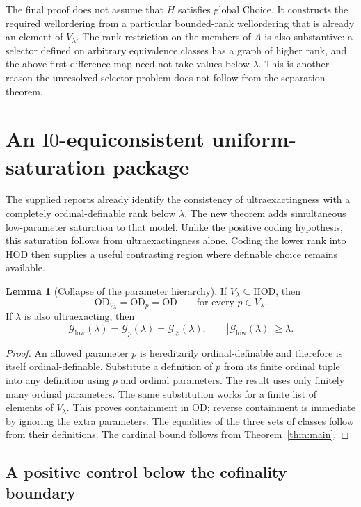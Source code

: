 \documentclass[11pt,letterpaper]{article}
\theoremstyle{definition}
\newtheorem{lemma}[definition]{Lemma}
\newcommand{\HOD}{\mathrm{HOD}}
\newcommand{\OD}{\mathrm{OD}}
\newcommand{\Izero}{\mathrm{I0}}
\numberwithin{equation}{section}
\newcommand{\Good}{\mathcal G}
\begin{document}
The final proof does not assume that $H$ satisfies global Choice. It constructs
the required wellordering from a particular bounded-rank wellordering that
is already an element of $V_\lambda$. The rank restriction on the members of
$A$ is also substantive: a selector defined on arbitrary equivalence classes
has a graph of higher rank, and the above first-difference map need not take
values below $\lambda$. This is another reason the unresolved selector problem
does not follow from the separation theorem.

\section{An \texorpdfstring{$\Izero$}{I0}-equiconsistent uniform-saturation package}\label{sec:consistency}

The supplied reports already identify the consistency of ultraexactingness
with a completely ordinal-definable rank below $\lambda$. The new theorem
adds simultaneous low-parameter saturation to that model. Unlike the
positive coding hypothesis, this saturation follows from ultraexactingness
alone. Coding the lower rank into $\HOD$ then supplies a useful contrasting
region where definable choice remains available.

\begin{lemma}[Collapse of the parameter hierarchy]\label{lem:parameter-collapse}
If $V_\lambda\subseteq\HOD$, then
\[
             \OD_{V_\lambda}=\OD_p=\OD
                         \qquad\text{for every }p\in V_\lambda.
\]
If $\lambda$ is also ultraexacting, then
\[
        \Good_{\mathrm{low}}(\lambda)=\Good_p(\lambda)=\Good_{\varnothing}(\lambda),
        \qquad |\Good_{\mathrm{low}}(\lambda)|\ge\lambda.
\]
\end{lemma}

\begin{proof}
An allowed parameter $p$ is hereditarily ordinal-definable and therefore is
itself ordinal-definable. Substitute a definition of $p$ from its finite
ordinal tuple into any definition using $p$ and ordinal parameters. The
result uses only finitely many ordinal parameters. The same substitution
works for a finite list of elements of $V_\lambda$. This proves containment
in $\OD$; reverse containment is immediate by ignoring the extra parameters.
The equalities of the three sets of classes follow from their definitions.
The cardinal bound follows from Theorem~\ref{thm:main}.
\end{proof}

\subsection{A positive control below the cofinality boundary}
\end{document}
